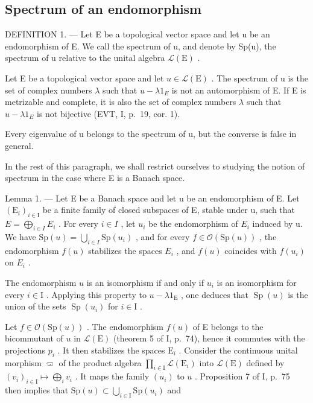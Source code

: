 \subsection{Spectrum of an endomorphism}

DEFINITION 1. --- Let E be a topological vector space and let u be an endomorphism of E. We call the spectrum of u, and denote by Sp(u), the spectrum of u relative to the unital algebra \(\mathcal{L}(\mathrm{E})\) .

Let E be a topological vector space and let \(u \in \mathcal{L}(\mathrm{E})\) . The spectrum of u is the set of complex numbers \(\lambda\) such that \(u - \lambda1_{E}\) is not an automorphism of E. If E is metrizable and complete, it is also the set of complex numbers \(\lambda\) such that \(u - \lambda1_{E}\) is not bijective (EVT, I, p.~19, cor. 1).

Every eigenvalue of u belongs to the spectrum of u, but the converse is false in general.

In the rest of this paragraph, we shall restrict ourselves to studying the notion of spectrum in the case where E is a Banach space.

Lemma 1. --- Let E be a Banach space and let u be an endomorphism of E. Let \((\mathrm{E}_{i})_{i\in\mathrm{I}}\) be a finite family of closed subspaces of E, stable under u, such that \(E = \bigoplus_{i\in I} E_{i}\) . For every \(i \in I\) , let \(u_{i}\) be the endomorphism of \(E_{i}\) induced by u. We have \(\mathrm{Sp}(u) = \bigcup_{i\in I} \mathrm{Sp}(u_{i})\) , and for every \(f \in \mathcal{O}(\mathrm{Sp}(u))\) , the endomorphism \(f(u)\) stabilizes the spaces \(E_{i}\) , and \(f(u)\) coincides with \(f(u_{i})\) on \(E_{i}\) .

The endomorphism \(u\) is an isomorphism if and only if \(u_i\) is an isomorphism for every \(i \in \mathrm{I}\) . Applying this property to \(u - \lambda 1_{\mathrm{E}}\) , one deduces that \(\operatorname{Sp}(u)\) is the union of the sets \(\operatorname{Sp}(u_i)\) for \(i \in \mathrm{I}\) .

Let \(f \in \mathcal{O}(\mathrm{Sp}(u))\) . The endomorphism \(f(u)\) of E belongs to the bicommutant of \(u\) in \(\mathcal{L}(\mathrm{E})\) (theorem 5 of I, p.~74), hence it commutes with the projections \(p_i\) . It then stabilizes the spaces \(\mathrm{E}_i\) . Consider the continuous unital morphism \(\varpi\) of the product algebra \(\prod_{i \in \mathrm{I}} \mathcal{L}(\mathrm{E}_i)\) into \(\mathcal{L}(\mathrm{E})\) defined by \((v_i)_{i \in \mathrm{I}} \mapsto \bigoplus_i v_i\) . It maps the family \((u_i)\) to \(u\) . Proposition 7 of I, p.~75 then implies that \(\mathrm{Sp}(u) \subset \bigcup_{i \in \mathrm{I}} \mathrm{Sp}(u_i)\) and


